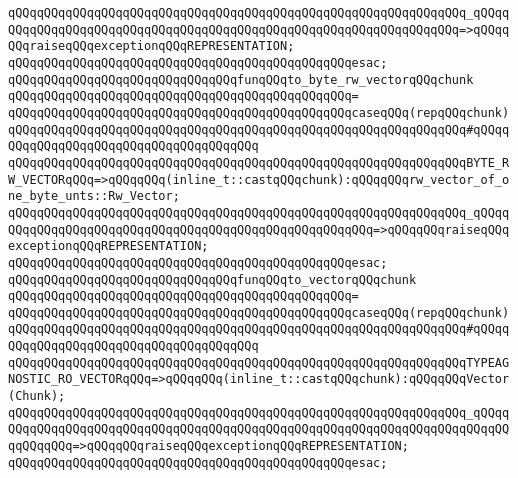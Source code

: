 \verb|qQQqqQQqqQQqqQQqqQQqqQQqqQQqqQQqqQQqqQQqqQQqqQQqqQQqqQQqqQQqqQQq_qQQqqQQqqQQqqQQqqQQqqQQqqQQqqQQqqQQqqQQqqQQqqQQqqQQqqQQqqQQqqQQqqQQq=>qQQqqQQqraiseqQQqexceptionqQQqREPRESENTATION;|\newline
\verb|qQQqqQQqqQQqqQQqqQQqqQQqqQQqqQQqqQQqqQQqqQQqqQQqesac;|\newline
\newline
\verb|qQQqqQQqqQQqqQQqqQQqqQQqqQQqqQQqfunqQQqto_byte_rw_vectorqQQqchunk|\newline
\verb|qQQqqQQqqQQqqQQqqQQqqQQqqQQqqQQqqQQqqQQqqQQqqQQq=|\newline
\verb|qQQqqQQqqQQqqQQqqQQqqQQqqQQqqQQqqQQqqQQqqQQqqQQqcaseqQQq(repqQQqchunk)|\newline
\verb|qQQqqQQqqQQqqQQqqQQqqQQqqQQqqQQqqQQqqQQqqQQqqQQqqQQqqQQqqQQqqQQq#qQQqqQQqqQQqqQQqqQQqqQQqqQQqqQQqqQQqqQQq|\newline
\verb|qQQqqQQqqQQqqQQqqQQqqQQqqQQqqQQqqQQqqQQqqQQqqQQqqQQqqQQqqQQqqQQqBYTE_RW_VECTORqQQq=>qQQqqQQq(inline_t::castqQQqchunk):qQQqqQQqrw_vector_of_one_byte_unts::Rw_Vector;|\newline
\verb|qQQqqQQqqQQqqQQqqQQqqQQqqQQqqQQqqQQqqQQqqQQqqQQqqQQqqQQqqQQqqQQq_qQQqqQQqqQQqqQQqqQQqqQQqqQQqqQQqqQQqqQQqqQQqqQQqqQQqqQQq=>qQQqqQQqraiseqQQqexceptionqQQqREPRESENTATION;|\newline
\verb|qQQqqQQqqQQqqQQqqQQqqQQqqQQqqQQqqQQqqQQqqQQqqQQqesac;|\newline
\newline
\verb|qQQqqQQqqQQqqQQqqQQqqQQqqQQqqQQqfunqQQqto_vectorqQQqchunk|\newline
\verb|qQQqqQQqqQQqqQQqqQQqqQQqqQQqqQQqqQQqqQQqqQQqqQQq=|\newline
\verb|qQQqqQQqqQQqqQQqqQQqqQQqqQQqqQQqqQQqqQQqqQQqqQQqcaseqQQq(repqQQqchunk)|\newline
\verb|qQQqqQQqqQQqqQQqqQQqqQQqqQQqqQQqqQQqqQQqqQQqqQQqqQQqqQQqqQQqqQQq#qQQqqQQqqQQqqQQqqQQqqQQqqQQqqQQqqQQqqQQq|\newline
\verb|qQQqqQQqqQQqqQQqqQQqqQQqqQQqqQQqqQQqqQQqqQQqqQQqqQQqqQQqqQQqqQQqTYPEAGNOSTIC_RO_VECTORqQQq=>qQQqqQQq(inline_t::castqQQqchunk):qQQqqQQqVector(Chunk);|\newline
\verb|qQQqqQQqqQQqqQQqqQQqqQQqqQQqqQQqqQQqqQQqqQQqqQQqqQQqqQQqqQQqqQQq_qQQqqQQqqQQqqQQqqQQqqQQqqQQqqQQqqQQqqQQqqQQqqQQqqQQqqQQqqQQqqQQqqQQqqQQqqQQqqQQqqQQq=>qQQqqQQqraiseqQQqexceptionqQQqREPRESENTATION;|\newline
\verb|qQQqqQQqqQQqqQQqqQQqqQQqqQQqqQQqqQQqqQQqqQQqqQQqesac;|\newline
\newline
